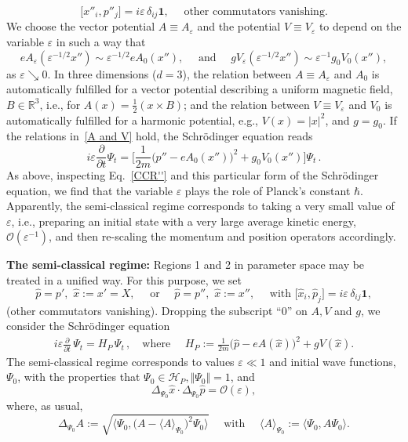\documentclass[11pt]{article}
\begin{document}
\begin{enumerate}
{\begin{equation}
\big[x''_i, p''_j \big] = i\varepsilon\, \delta_{ij} \mathbf{1}, \quad \text{ other commutators vanishing.}
\end{equation}
We choose the vector potential $A\equiv A_{\varepsilon}$ and the potential $V\equiv V_{\varepsilon}$ to depend 
on the variable $\varepsilon$ in such a way that
\begin{equation}\label{A and V}
eA_{\varepsilon}(\varepsilon^{-1/2}x'') \sim \varepsilon ^{-1/2}eA_{0}(x''),\quad \text{ and } \quad 
gV_{\varepsilon}(\varepsilon^{-1/2} x'') \sim \varepsilon ^{-1} g_{0}V_{0}(x''), 
\end{equation}
as $\varepsilon \searrow 0$. In three dimensions ($d=3$), the relation between $A\equiv A_{\varepsilon}$ and $A_0$ 
is automatically fulfilled for a vector potential describing a uniform magnetic field, $B \in \mathbb{R}^{3}$, i.e., for 
$A(x)= \frac{1}{2} (x \times B)$; and the relation between $V\equiv V_{\varepsilon}$ 
and $V_{0}$ is automatically fulfilled for a harmonic potential, e.g., $V(x)= \vert x \vert^{2}$, and $g= g_0$. 
If the relations in~\eqref{A and V} hold, the Schr\"odinger equation reads
$$i \varepsilon \frac{\partial}{\partial t} \Psi_t = \Big[\frac{1}{2m}\big(p'' - e A_{0}(x'')\big)^{2} + 
g_{0}V_{0}(x'') \Big] \Psi_t\,.$$
As above, inspecting Eq.~\eqref{CCR''} and this particular form of the Schr\"odinger equation, we find that the 
variable $\varepsilon$ plays the role of Planck's constant $\hbar$. Apparently, the semi-classical regime 
corresponds to taking a very small value of $\varepsilon$, i.e., preparing an initial state with a very large average kinetic energy, $\mathcal{O}(\varepsilon^{-1})$, and then re-scaling the momentum and  position operators accordingly.}
\end{enumerate}

\noindent
{\bf{The semi-classical regime:}} Regions 1 and 2 in parameter space may be treated in a unified way. For this purpose, we set 
\begin{equation}\label{CCR'''}
 \hat{p}= p', \,\,\hat{x}:=x'=X, \quad \text{ or } \quad\hat{p}=p'',\,\, \hat{x}:=x'', \quad \text{ with } 
 \big[\hat{x}_i, \hat{p}_j\big] = i \varepsilon\, \delta_{ij}\mathbf{1},
 \end{equation}
(other commutators vanishing). Dropping the subscript ``0'' on $A, V$ and $g$, we consider the Schr\"odinger equation
\begin{align}\label{Schrod}
i \varepsilon \frac{\partial}{\partial t}\, \Psi_t = H_{P}\, \Psi_t\,,  \quad\text{where }\quad H_{P}:=  \frac{1}{2m}\big(\hat{p} - eA(\hat{x})\big)^{2} + gV(\hat{x}).
\end{align}
The semi-classical regime corresponds to values $\varepsilon \ll 1$ and initial wave functions, $\Psi_0$, with 
the properties that $\Psi_0 \in \mathcal{H}_{P}, \Vert \Psi_0 \Vert =1$, and
\begin{equation}\label{Var}
 \Delta_{\Psi_0}\hat{x} \cdot \Delta_{\Psi_0} \hat{p} = \mathcal{O}(\varepsilon),
 \end{equation}
 where, as usual,
 $$\Delta_{\Psi_0}A:= \sqrt{\langle \Psi_0, \big(A- \langle A \rangle_{\Psi_0}\big)^{2} \Psi_0 \rangle} \quad \text{ with } \quad
\langle A\rangle_{\Psi_0}:= \langle \Psi_0, A \Psi_0 \rangle. $$
\end{document}
